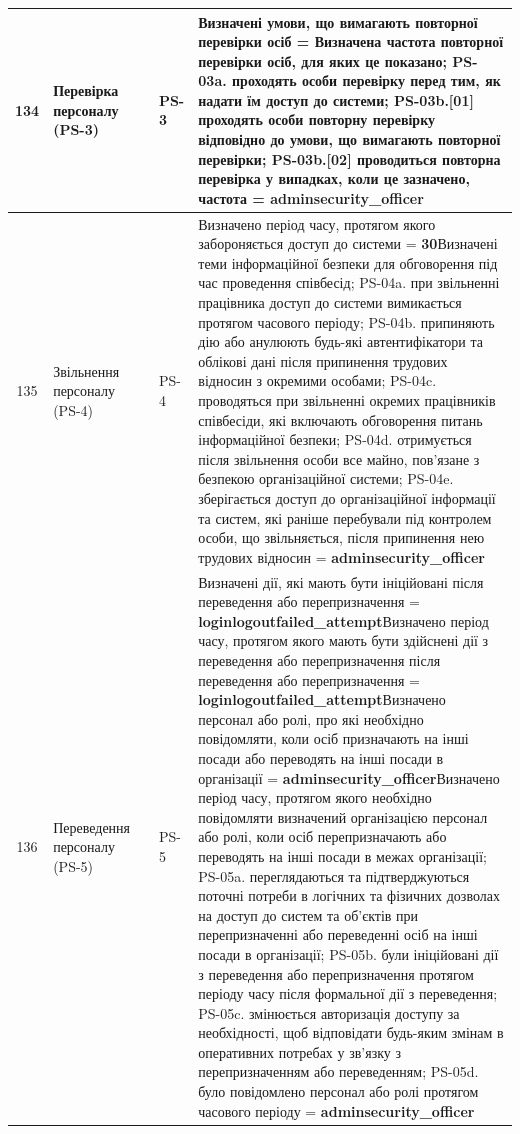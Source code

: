 \documentclass[10pt]{article}
\begin{document}
\begin{longtable}{|c|>{\raggedright\arraybackslash}p{4cm}|>{\raggedright\arraybackslash}p{2.5cm}|>{\raggedright\arraybackslash}p{3.5cm}|>{\raggedright\arraybackslash}p{5.5cm}|}
134 & Перевірка персоналу (PS-3) &  & PS-3 & Визначені умови, що вимагають повторної перевірки осіб = \textbf{}\newline Визначена частота повторної перевірки осіб, для яких це показано; PS-03a. проходять особи перевірку перед тим, як надати їм доступ до системи; PS-03b.[01] проходять особи повторну перевірку відповідно до умови, що вимагають повторної перевірки; PS-03b.[02] проводиться повторна перевірка у випадках, коли це зазначено, частота = \textbf{adminsecurity\_\allowbreak{}officer} \\ \hline
135 & Звільнення персоналу (PS-4) &  & PS-4 & Визначено період часу, протягом якого забороняється доступ до системи = \textbf{30}\newline Визначені теми інформаційної безпеки для обговорення під час проведення співбесід; PS-04a. при звільненні працівника доступ до системи вимикається протягом часового періоду; PS-04b. припиняють дію або анулюють будь-які автентифікатори та облікові дані після припинення трудових відносин з окремими особами; PS-04c. проводяться при звільненні окремих працівників співбесіди, які включають обговорення питань інформаційної безпеки; PS-04d. отримується після звільнення особи все майно, пов'язане з безпекою організаційної системи; PS-04e. зберігається доступ до організаційної інформації та систем, які раніше перебували під контролем особи, що звільняється, після припинення нею трудових відносин = \textbf{adminsecurity\_\allowbreak{}officer} \\ \hline
136 & Переведення персоналу (PS-5) &  & PS-5 & Визначені дії, які мають бути ініційовані після переведення або перепризначення = \textbf{loginlogoutfailed\_\allowbreak{}attempt}\newline Визначено період часу, протягом якого мають бути здійснені дії з переведення або перепризначення після переведення або перепризначення = \textbf{loginlogoutfailed\_\allowbreak{}attempt}\newline Визначено персонал або ролі, про які необхідно повідомляти, коли осіб призначають на інші посади або переводять на інші посади в організації = \textbf{adminsecurity\_\allowbreak{}officer}\newline Визначено період часу, протягом якого необхідно повідомляти визначений організацією персонал або ролі, коли осіб перепризначають або переводять на інші посади в межах організації; PS-05a. переглядаються та підтверджуються поточні потреби в логічних та фізичних дозволах на доступ до систем та об'єктів при перепризначенні або переведенні осіб на інші посади в організації; PS-05b. були ініційовані дії з переведення або перепризначення протягом періоду часу після формальної дії з переведення; PS-05c. змінюється авторизація доступу за необхідності, щоб відповідати будь-яким змінам в оперативних потребах у зв'язку з перепризначенням або переведенням; PS-05d. було повідомлено персонал або ролі протягом часового періоду = \textbf{adminsecurity\_\allowbreak{}officer} \\ \hline

\end{longtable}
\end{document}
